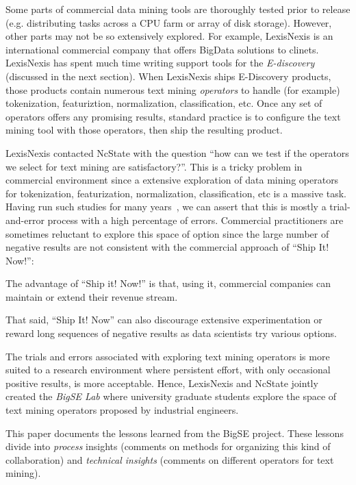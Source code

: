 \documentclass{sig-alternate-05-2015}
\newcommand{\bi}{\begin{itemize*}}
\newcommand{\ei}{\end{itemize*}}
\begin{document}
Some parts of commercial data mining tools are thoroughly tested prior to
release (e.g. distributing tasks across
a CPU farm or array of disk storage). However, other parts
may not be so extensively explored. For example, 
LexisNexis  is an international commercial company that offers
BigData solutions to clinets. LexisNexis has
spent much time writing support tools for the {\em E-discovery} (discussed
in the next section).  
When LexisNexis ships E-Discovery products, those products contain
numerous text mining {\em operators} to handle (for example)
tokenization, featuriztion, normalization, classification, etc. 
Once any set of operators offers any promising results,
standard practice is to configure the text mining tool
with those operators, then ship the resulting product.

LexisNexis contacted NcState with the question ``how can
we test if the operators we select for text mining are 
satisfactory?''. This is a tricky problem in commercial
environment since a
extensive exploration of  data mining operators for
tokenization, featurization, normalization, classification, etc
is a massive task. Having run such studies for many years~\cite{menzies2014sharing},
we can assert that this is mostly a trial-and-error process
with a high percentage of errors. Commercial practitioners
are sometimes reluctant to explore this  space of option
since the large number of negative results are not consistent
with the commercial approach of ``Ship It! Now!'':
\bi
\item
The advantage
of ``Ship it! Now!'' is that, using it,  commercial companies can maintain
or extend their revenue stream.
\item
That said, ``Ship It! Now''
can also discourage extensive experimentation or reward  long sequences
of negative results as data scientists try various options.
\ei
The trials and errors associated with exploring text mining operators
is more suited to a research environment where persistent effort, with only occasional positive results, is more acceptable. Hence,
LexisNexis and NcState jointly created the {\em BigSE Lab}  where
university graduate students explore    the space of text mining
operators proposed by 
industrial engineers. 





This paper documents the lessons learned from the BigSE project. 
These lessons divide into {\em process} insights (comments
on methods for organizing this kind of collaboration) and {\em technical
insights} (comments on different operators for text mining).
 
\end{document}
